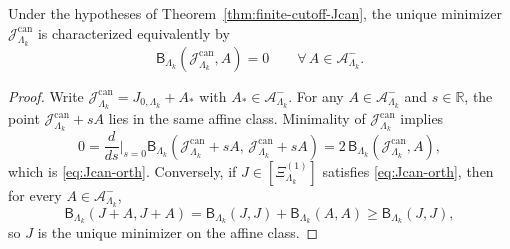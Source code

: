 \begin{proposition}
\label{prop:Jcan-orth}
Under the hypotheses of Theorem~\ref{thm:finite-cutoff-Jcan}, the unique minimizer
\(\mathcal J^{\mathrm{can}}_{\Lambda_k}\) is characterized equivalently by
\begin{equation}
\mathsf B_{\Lambda_k}(\mathcal J^{\mathrm{can}}_{\Lambda_k},A)=0
\qquad
\forall\,A\in\mathcal A^-_{\Lambda_k}.
\label{eq:Jcan-orth}
\end{equation}
\end{proposition}

\begin{proof}
Write \(\mathcal J^{\mathrm{can}}_{\Lambda_k}=J_{0,\Lambda_k}+A_{\ast}\) with
\(A_{\ast}\in\mathcal A^-_{\Lambda_k}\).
For any \(A\in\mathcal A^-_{\Lambda_k}\) and \(s\in\mathbb R\), the point
\(\mathcal J^{\mathrm{can}}_{\Lambda_k}+sA\) lies in the same affine class.
Minimality of \(\mathcal J^{\mathrm{can}}_{\Lambda_k}\) implies
\[
0=\frac{d}{ds}\Big\rvert_{s=0}
\mathsf B_{\Lambda_k}(\mathcal J^{\mathrm{can}}_{\Lambda_k}+sA,\,
\mathcal J^{\mathrm{can}}_{\Lambda_k}+sA)
=2\,\mathsf B_{\Lambda_k}(\mathcal J^{\mathrm{can}}_{\Lambda_k},A),
\]
which is \eqref{eq:Jcan-orth}. Conversely, if \(J\in[\Xi^{(1)}_{\Lambda_k}]\)
 satisfies \eqref{eq:Jcan-orth}, then for every \(A\in\mathcal A^-_{\Lambda_k}\),
\[
\mathsf B_{\Lambda_k}(J+A,J+A)
=
\mathsf B_{\Lambda_k}(J,J)+\mathsf B_{\Lambda_k}(A,A)
\ge
\mathsf B_{\Lambda_k}(J,J),
\]
so \(J\) is the unique minimizer on the affine class.
\end{proof}

